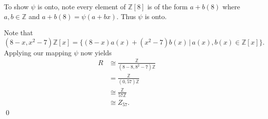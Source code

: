 \documentclass{article}
\begin{document}
To show $\psi$ is onto, note every element of $\mathbb{Z}[8]$ is of the form $a + b(8)$ where $a, b \in \mathbb{Z}$ and $a + b(8) = \psi(a+bx)$. Thus $\psi$ is onto.

Note that
$$ (8-x, x^2-7)\mathbb{Z}[x] = \{ (8-x)a(x) + (x^2-7)b(x) \, \vert \, a(x), b(x) \in \mathbb{Z}[x]\}. $$
Applying our mapping $\psi$ now yields
\begin{align*}
	R &\cong \frac{\mathbb{Z}}{(8-8, 8^2 - 7)\mathbb{Z}} \\
	&=\frac{\mathbb{Z}}{(0, 57)\mathbb{Z}} \\
	&\cong \frac{\mathbb{Z}}{57\mathbb{Z}} \\
	&\cong Z_{57}.
\end{align*}
\qed \\
\end{document}
